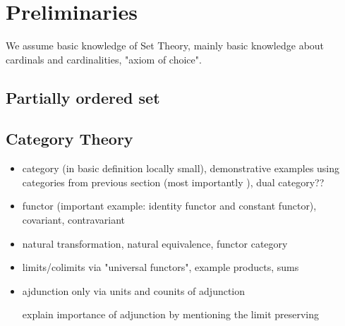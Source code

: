 \chapter{Preliminaries}
    We assume basic knowledge of Set Theory, mainly basic knowledge about cardinals and cardinalities, "axiom of choice".

\section{Partially ordered set}
\section{Category Theory}
\begin{itemize}
    \item category (in basic definition locally small), demonstrative  examples using categories from previous section (most importantly \Bool), dual category??
    \item functor (important example: identity functor and constant functor), covariant, contravariant
    \item natural transformation, natural equivalence, functor category
    \item limits/colimits via "universal functors", example products, sums
    \item ajdunction only via units and counits of adjunction

    explain importance of adjunction by mentioning the limit preserving
\end{itemize}


